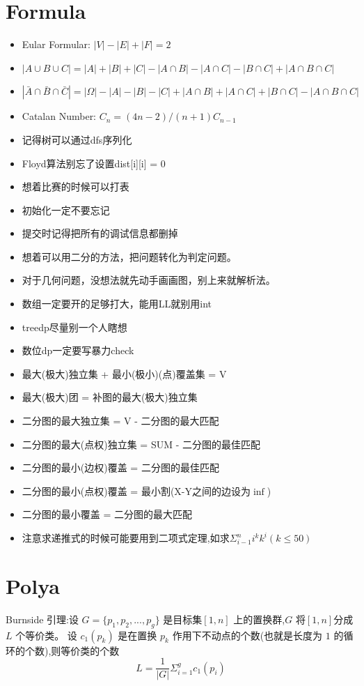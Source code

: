 \documentclass[
	10pt,
	twocolumn,
	a4paper,
]{article}
\begin{document}
\section{Formula}
\begin{itemize} 
\setlength{\itemsep}{0pt}
\item Eular Formular: $|V| - |E| + |F| = 2$
\item $|A \cup B \cup C | = |A| + |B| + |C| - |A \cap B| - |A \cap C| - |B \cap C| + |A \cap B \cap C|$
\item $|\bar A \cap \bar B \cap \bar C | = |\Omega| - |A| - |B| - |C| + |A \cap B| + |A \cap C| + |B \cap C| - |A \cap B \cap C| $
\item Catalan Number: $C_n = (4n-2) / (n+1) C_{n-1}$
\item 记得树可以通过dfs序列化
\item Floyd算法别忘了设置dist[i][i] = 0
\item 想着比赛的时候可以打表
\item 初始化一定不要忘记
\item 提交时记得把所有的调试信息都删掉
\item 想着可以用二分的方法，把问题转化为判定问题。
\item 对于几何问题，没想法就先动手画画图，别上来就解析法。
\item 数组一定要开的足够打大，能用LL就别用int
\item treedp尽量别一个人瞎想
\item 数位dp一定要写暴力check
\item 最大(极大)独立集 + 最小(极小)(点)覆盖集 = V
\item 最大(极大)团 = 补图的最大(极大)独立集
\item 二分图的最大独立集 = V - 二分图的最大匹配
\item 二分图的最大(点权)独立集 = SUM - 二分图的最佳匹配
\item 二分图的最小(边权)覆盖 = 二分图的最佳匹配
\item 二分图的最小(点权)覆盖 = 最小割(X-Y之间的边设为$\inf$)
\item 二分图的最小覆盖 = 二分图的最大匹配
\item 注意求递推式的时候可能要用到二项式定理,如求$ \Sigma_{i-1}^n{i^k k^i} (k \le 50) $
\end{itemize} 

\section{Polya}
Burnside 引理:设 $G = \{p_1, p_2, ..., p_g\}$ 是目标集$[1, n]$ 上的置换群,$G$ 将$[1, n]$分成 $L$ 个等价类。
设 $c_1(p_k)$ 是在置换 $p_k$ 作用下不动点的个数(也就是长度为 $1$ 的循环的个数),则等价类的个数
$$L = \frac{1}{|G|} \Sigma_{i=1}^{g}{c_1(p_i)}$$
\end{document}
